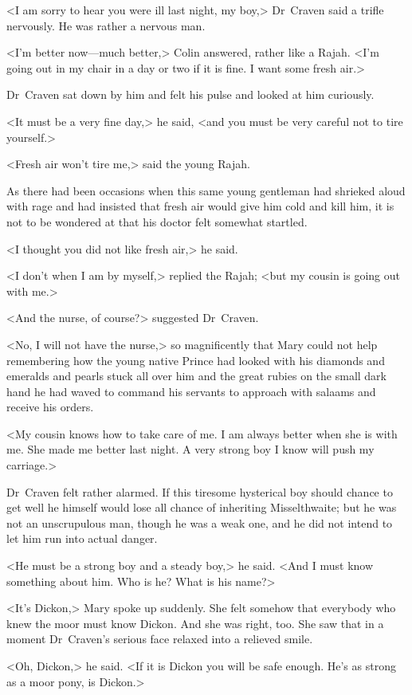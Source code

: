 <I am sorry to hear you were ill last night, my boy,> Dr~Craven said a trifle nervously. He was rather a nervous man.

<I'm better now—much better,> Colin answered, rather like a Rajah. <I'm going out in my chair in a day or two if it is fine. I want some fresh air.>

Dr~Craven sat down by him and felt his pulse and looked at him curiously.

<It must be a very fine day,> he said, <and you must be very careful not to tire yourself.>

<Fresh air won't tire me,> said the young Rajah.

As there had been occasions when this same young gentleman had shrieked aloud with rage and had insisted that fresh air would give him cold and kill him, it is not to be wondered at that his doctor felt somewhat startled.

<I thought you did not like fresh air,> he said.

<I don't when I am by myself,> replied the Rajah; <but my cousin is going out with me.>

<And the nurse, of course?> suggested Dr~Craven.

<No, I will not have the nurse,> so magnificently that Mary could not help remembering how the young native Prince had looked with his diamonds and emeralds and pearls stuck all over him and the great rubies on the small dark hand he had waved to command his servants to approach with salaams and receive his orders.

<My cousin knows how to take care of me. I am always better when she is with me. She made me better last night. A very strong boy I know will push my carriage.>

Dr~Craven felt rather alarmed. If this tiresome hysterical boy should chance to get well he himself would lose all chance of inheriting Misselthwaite; but he was not an unscrupulous man, though he was a weak one, and he did not intend to let him run into actual danger.

<He must be a strong boy and a steady boy,> he said. <And I must know something about him. Who is he? What is his name?>

<It's Dickon,> Mary spoke up suddenly. She felt somehow that everybody who knew the moor must know Dickon. And she was right, too. She saw that in a moment Dr~Craven's serious face relaxed into a relieved smile.

<Oh, Dickon,> he said. <If it is Dickon you will be safe enough. He's as strong as a moor pony, is Dickon.>

